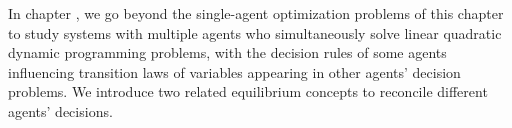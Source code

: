   In chapter , we go beyond the single-agent optimization
problems of this chapter  to study
systems with multiple  agents who simultaneously solve
linear quadratic dynamic programming problems, with the decision rules of some agents influencing transition
   laws of variables appearing in other agents' decision problems.  We introduce two related equilibrium concepts
   to reconcile different agents' decisions.

%
%
%
%
